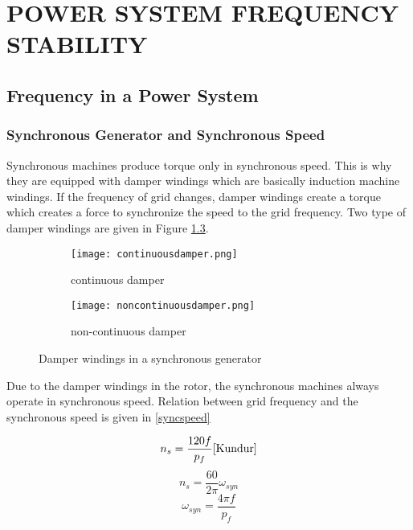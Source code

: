 \chapter{POWER SYSTEM FREQUENCY STABILITY}
\label{chp:2}

\section{Frequency in a Power System}
\subsection{Synchronous Generator and Synchronous Speed}

Synchronous machines produce torque only in synchronous speed. This is why they are equipped with damper windings which are basically induction machine windings. If the frequency of  grid changes, damper windings create a torque which creates a force to synchronize the speed to the grid frequency. Two type of damper windings are given in Figure \ref{damperwindings}.

\begin{figure}[h!]
	\centering
	\begin{subfigure}{.5\textwidth}
		\centering
		\texttt{[image: continuousdamper.png]}
		\caption{continuous damper}
		\label{continuousdamper}
	\end{subfigure}%
	\begin{subfigure}{.5\textwidth}
		\centering
		\texttt{[image: noncontinuousdamper.png]}
		\caption{non-continuous damper}
		\label{noncontinuousdamper}
	\end{subfigure}
	\caption{Damper windings in a synchronous generator \cite{Kundur}}
	\label{damperwindings}
\end{figure}

Due to the damper windings in the rotor, the synchronous machines always operate in synchronous speed. Relation between grid frequency and the synchronous speed is given in \ref{syncspeed}

\begin{equation}
 n_{s}=\frac{120f}{p_{f}}\cite{Kundur}
\end{equation}
\begin{equation}
 n_{s}=\frac{60}{2\pi}\omega_{syn}
\end{equation}
\begin{equation}
\omega_{syn}=\frac{4\pi f}{p_{f}}
\label{syncspeed}
\end{equation}

